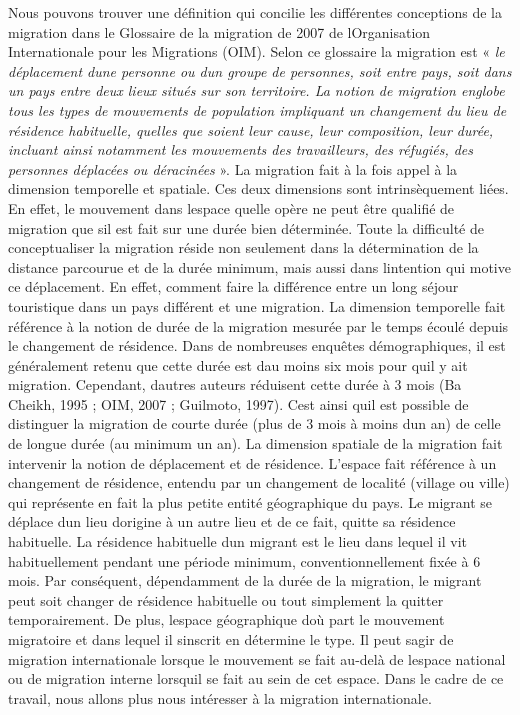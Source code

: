 \documentclass[
  letterpaper,
  DIV=11,
  numbers=noendperiod]{scrartcl}
\begin{document}
Nous pouvons trouver une définition qui concilie les différentes
conceptions de la migration dans le Glossaire de la migration de 2007 de
l\textquotesingle Organisation Internationale pour les Migrations (OIM).
Selon ce glossaire la migration est « \emph{le déplacement
d\textquotesingle une personne ou d\textquotesingle un groupe de
personnes, soit entre pays, soit dans un pays entre deux lieux situés
sur son territoire. La notion de migration englobe tous les types de
mouvements de population impliquant un changement du lieu de résidence
habituelle, quelles que soient leur cause, leur composition, leur durée,
incluant ainsi notamment les mouvements des travailleurs, des réfugiés,
des personnes déplacées ou déracinées} ». La migration fait à la fois
appel à la dimension temporelle et spatiale. Ces deux dimensions sont
intrinsèquement liées. En effet, le mouvement dans
l\textquotesingle espace qu\textquotesingle elle opère ne peut être
qualifié de migration que s\textquotesingle il est fait sur une durée
bien déterminée. Toute la difficulté de conceptualiser la migration
réside non seulement dans la détermination de la distance parcourue et
de la durée minimum, mais aussi dans l\textquotesingle intention qui
motive ce déplacement. En effet, comment faire la différence entre un
long séjour touristique dans un pays différent et une migration. La
dimension temporelle fait référence à la notion de durée de la migration
mesurée par le temps écoulé depuis le changement de résidence. Dans de
nombreuses enquêtes démographiques, il est généralement retenu que cette
durée est d\textquotesingle au moins six mois pour qu\textquotesingle il
y ait migration. Cependant, d\textquotesingle autres auteurs réduisent
cette durée à 3 mois (Ba Cheikh, 1995 ; OIM, 2007 ; Guilmoto, 1997).
C\textquotesingle est ainsi qu\textquotesingle il est possible de
distinguer la migration de courte durée (plus de 3 mois à moins
d\textquotesingle un an) de celle de longue durée (au minimum un an). La
dimension spatiale de la migration fait intervenir la notion de
déplacement et de résidence. L'espace fait référence à un changement de
résidence, entendu par un changement de localité (village ou ville) qui
représente en fait la plus petite entité géographique du pays. Le
migrant se déplace d\textquotesingle un lieu d\textquotesingle origine à
un autre lieu et de ce fait, quitte sa résidence habituelle. La
résidence habituelle d\textquotesingle un migrant est le lieu dans
lequel il vit habituellement pendant une période minimum,
conventionnellement fixée à 6 mois. Par conséquent, dépendamment de la
durée de la migration, le migrant peut soit changer de résidence
habituelle ou tout simplement la quitter temporairement. De plus,
l\textquotesingle espace géographique d\textquotesingle où part le
mouvement migratoire et dans lequel il s\textquotesingle inscrit en
détermine le type. Il peut s\textquotesingle agir de migration
internationale lorsque le mouvement se fait au-delà de
l\textquotesingle espace national ou de migration interne
lorsqu\textquotesingle il se fait au sein de cet espace. Dans le cadre
de ce travail, nous allons plus nous intéresser à la migration
internationale.
\end{document}
